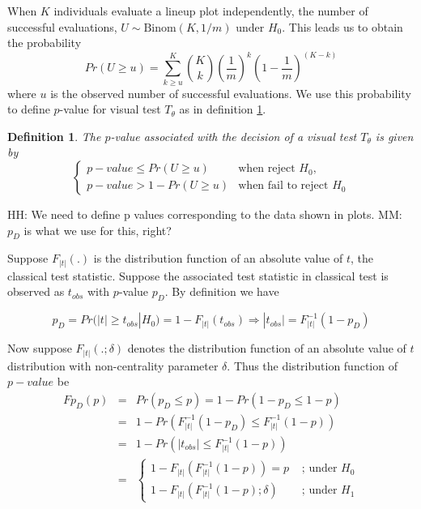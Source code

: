 \documentclass{article}
\newcommand{\red}[1]{{\color{red} #1}}
\newtheorem{dfn}{Definition}[section]
\begin{document}
When $K$ individuals evaluate a lineup plot independently, the number of successful evaluations, $U \sim \text{Binom} (K,1/m)$  under $H_0$. This leads us to obtain the probability $$Pr(U \ge u)= \sum_{k \ge u}^K {{K \choose k} (\frac{1}{m})^k(1-\frac 1m)^{(K-k)}}$$ where $u$ is the observed number of successful evaluations. We use this probability to  define $p$-value for visual test $T_{\theta}$ as in definition \ref{dfn:pval}.
\begin{dfn} \label{dfn:pval}
The $p$-value associated with the decision of a visual test $T_{\theta}$ is given by 
    \begin{equation*}
        \begin{cases} 
              p-value \le Pr(U \ge u)    & \text{when reject $H_0$,} \\
              p-value > 1-Pr(U \ge u)  & \text{when fail to reject $H_0$}
        \end{cases}
    \end{equation*}
\end{dfn}

\red{HH: We need to define p values corresponding to the data shown in plots.  MM: $p_D$ is what we use for this, right?}


Suppose $F_{|t|}(.)$ is the distribution function of an absolute value of $t$, the classical test statistic. Suppose the associated test statistic in classical test is observed as  $t_{obs}$ with $p$-value $p_D$. By definition we have 

$$p_D=Pr(|t| \ge t_{obs}| H_0)=1-F_{|t|}(t_{obs}) \Rightarrow |t_{obs}|=F_{|t|}^{-1}(1-p_D)$$

Now suppose $F_{|t|}(.;\delta)$ denotes the distribution function of an absolute value of $t$ distribution with non-centrality parameter $\delta$. Thus the distribution function of $p-value$ be  
\begin{eqnarray}\label{dist_p}
F{p_D}(p) &=& Pr(p_D \le p)=1-Pr(1-p_D \le 1-p) \nonumber \\
  &=& 1-Pr(F_{|t|}^{-1}(1-p_D) \le F_{|t|}^{-1}(1-p) ) \nonumber \\
  &=& 1-Pr(|t_{obs}| \le F_{|t|}^{-1}(1-p)) \nonumber \\
  &=&\left\{ \begin{array}{ll}
          1-F_{|t|}( F_{|t|}^{-1}(1-p))=p &\mbox{ ; under $H_0$} \\
          1-F_{|t|}( F_{|t|}^{-1}(1-p); \delta) &\mbox{ ; under $H_1$} 
       \end{array} \right.     
\end{eqnarray}
\end{document}
